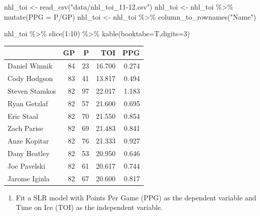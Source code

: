 \documentclass[
  11pt,
]{book}
\newenvironment{Shaded}{\begin{snugshade}}{\end{snugshade}}
\newcommand{\AttributeTok}[1]{\textcolor[rgb]{0.77,0.63,0.00}{#1}}
\newcommand{\DecValTok}[1]{\textcolor[rgb]{0.00,0.00,0.81}{#1}}
\newcommand{\FunctionTok}[1]{\textcolor[rgb]{0.00,0.00,0.00}{#1}}
\newcommand{\NormalTok}[1]{#1}
\newcommand{\OtherTok}[1]{\textcolor[rgb]{0.56,0.35,0.01}{#1}}
\newcommand{\SpecialCharTok}[1]{\textcolor[rgb]{0.00,0.00,0.00}{#1}}
\newcommand{\StringTok}[1]{\textcolor[rgb]{0.31,0.60,0.02}{#1}}
\providecommand{\tightlist}{%
  \setlength{\itemsep}{0pt}\setlength{\parskip}{0pt}}
\theoremstyle{definition}
\theoremstyle{definition}
\theoremstyle{definition}
\theoremstyle{definition}
\theoremstyle{remark}
\begin{document}
\begin{Shaded}
\begin{Highlighting}[]
\NormalTok{nhl\_toi }\OtherTok{\textless{}{-}} \FunctionTok{read\_csv}\NormalTok{(}\StringTok{"data/nhl\_toi\_11{-}12.csv"}\NormalTok{)}
\NormalTok{nhl\_toi }\OtherTok{\textless{}{-}}\NormalTok{ nhl\_toi }\SpecialCharTok{\%\textgreater{}\%} \FunctionTok{mutate}\NormalTok{(}\AttributeTok{PPG =}\NormalTok{ P}\SpecialCharTok{/}\NormalTok{GP)}
\NormalTok{nhl\_toi }\OtherTok{\textless{}{-}}\NormalTok{ nhl\_toi }\SpecialCharTok{\%\textgreater{}\%} \FunctionTok{column\_to\_rownames}\NormalTok{(}\StringTok{"Name"}\NormalTok{)}

\NormalTok{nhl\_toi }\SpecialCharTok{\%\textgreater{}\%} \FunctionTok{slice}\NormalTok{(}\DecValTok{1}\SpecialCharTok{:}\DecValTok{10}\NormalTok{) }\SpecialCharTok{\%\textgreater{}\%} \FunctionTok{kable}\NormalTok{(}\AttributeTok{booktabs=}\NormalTok{T,}\AttributeTok{digits=}\DecValTok{3}\NormalTok{)}
\end{Highlighting}
\end{Shaded}

\begin{tabular}{lrrrr}
\toprule
  & GP & P & TOI & PPG\\
\midrule
Daniel Winnik & 84 & 23 & 16.700 & 0.274\\
Cody Hodgson & 83 & 41 & 13.817 & 0.494\\
Steven Stamkos & 82 & 97 & 22.017 & 1.183\\
Ryan Getzlaf & 82 & 57 & 21.600 & 0.695\\
Eric Staal & 82 & 70 & 21.550 & 0.854\\
\addlinespace
Zach Parise & 82 & 69 & 21.483 & 0.841\\
Anze Kopitar & 82 & 76 & 21.333 & 0.927\\
Dany Heatley & 82 & 53 & 20.950 & 0.646\\
Joe Pavelski & 82 & 61 & 20.617 & 0.744\\
Jarome Iginla & 82 & 67 & 20.600 & 0.817\\
\bottomrule
\end{tabular}

\begin{enumerate}
\def\labelenumi{(\alph{enumi})}
\setcounter{enumi}{1}
\tightlist
\item
  Fit a SLR model with Points Per Game (PPG) as the dependent variable and Time on Ice (TOI) as the independent variable.
\end{enumerate}
\end{document}

